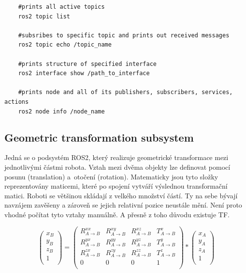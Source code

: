 \begin{verbatim}
	#prints all active topics
	ros2 topic list 
	
	#subsribes to specific topic and prints out received messages
	ros2 topic echo /topic_name
	
	#prints structure of specified interface
	ros2 interface show /path_to_interface
	
	#prints node and all of its publishers, subscribers, services, actions
	ros2 node info /node_name
\end{verbatim}

\subsection*{Geometric transformation subsystem} \label{theory:tf}
Jedná se o podsystém ROS2, který realizuje geometrické transformace mezi jednotlivými částmi robota.
Vztah mezi dvěma objekty lze definovat pomocí posunu (translation) a~otočení (rotation). Matematicky jsou tyto složky reprezentovány maticemi, které po spojení vytváří výslednou transformační matici. Roboti se většinou skládají z velkého množství částí. Ty na sebe bývají navzájem zavěšeny a zároveň se jejich relativní pozice neustále mění. Není proto vhodné počítat tyto vztahy manuálně. A přesně z toho důvodu existuje TF. \cite[str:~63-67]{ros2_introduction}

\begin{equation}
	\begin{pmatrix}
		x_B\\
		y_B\\
		z_B\\
		1\\
	\end{pmatrix}
	=
	\begin{pmatrix}
		R_{A\rightarrow B}^{xx} & R_{A\rightarrow B}^{xy} & R_{A\rightarrow B}^{xz} & T_{A\rightarrow B}^x\\
		R_{A\rightarrow B}^{yx} & R_{A\rightarrow B}^{yy} & R_{A\rightarrow B}^{yz} & T_{A\rightarrow B}^y\\
		R_{A\rightarrow B}^{zx} & R_{A\rightarrow B}^{zy} & R_{A\rightarrow B}^{zz} & T_{A\rightarrow B}^z\\
		0 & 0 & 0 & 1\\
	\end{pmatrix}
	*
	\begin{pmatrix}
		x_A\\
		y_A\\
		z_A\\
		1\\
	\end{pmatrix}
\end{equation}

